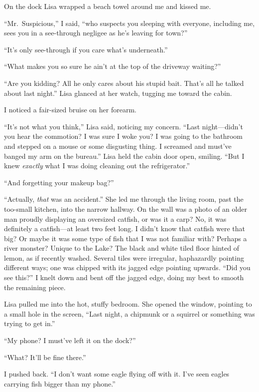 On the dock Lisa wrapped a beach towel around me and kissed me.

``Mr.~Suspicious,'' I said, ``who suspects you sleeping with everyone,
including me, sees you in a see-through negligee as he's leaving for
town?''

``It's only see-through if you care what's underneath.''

``What makes you so sure he ain't at the top of the driveway waiting?''

``Are you kidding? All he only cares about his stupid bait. That's all
he talked about last night.'' Lisa glanced at her watch, tugging me
toward the cabin.

I noticed a fair-sized bruise on her forearm.

``It's not what you think,'' Lisa said, noticing my concern. ``Last
night---didn't you hear the commotion? I was sure I woke you? I was
going to the bathroom and stepped on a mouse or some disgusting thing. I
screamed and must've banged my arm on the bureau.'' Lisa held the cabin
door open, smiling. ``But I knew \emph{exactly} what I was doing
cleaning out the refrigerator.''

``And forgetting your makeup bag?''

``Actually, \emph{that} was an accident.'' She led me through the living
room, past the too-small kitchen, into the narrow hallway. On the wall
was a photo of an older man proudly displaying an oversized catfish, or
was it a carp? No, it was definitely a catfish---at least two feet long.
I didn't know that catfish were that big? Or maybe it was some type of
fish that I was not familiar with? Perhaps a river monster? Unique to
the Lake? The black and white tiled floor hinted of lemon, as if
recently washed. Several tiles were irregular, haphazardly pointing
different ways; one was chipped with its jagged edge pointing upwards.
``Did you see this?'' I knelt down and bent off the jagged edge, doing
my best to smooth the remaining piece.

Lisa pulled me into the hot, stuffy bedroom. She opened the window,
pointing to a small hole in the screen, ``Last night, a chipmunk or a
squirrel or something was trying to get in.''

``My phone? I must've left it on the dock?''

``What? It'll be fine there.''

I pushed back. ``I don't want some eagle flying off with it. I've seen
eagles carrying fish bigger than my phone.''

